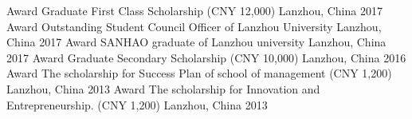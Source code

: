 \begin{cvhonors}
  \cvhonor
    {Award}
    {Graduate First Class Scholarship (CNY 12,000)}
    {Lanzhou, China}
    {2017}
  \cvhonor
    {Award}
    {Outstanding Student Council Officer of Lanzhou University}
    {Lanzhou, China}
    {2017}
  \cvhonor
    {Award}
    {SANHAO graduate of Lanzhou university}
    {Lanzhou, China}
    {2017}
  \cvhonor
    {Award}
    {Graduate Secondary Scholarship (CNY 10,000)}
    {Lanzhou, China}
    {2016}
  \cvhonor
    {Award}
    {The scholarship for Success Plan of school of management (CNY 1,200)}
    {Lanzhou, China}
    {2013}
  \cvhonor
    {Award}
    {The scholarship for Innovation and Entrepreneurship. (CNY 1,200)}
    {Lanzhou, China}
    {2013}
\end{cvhonors}
